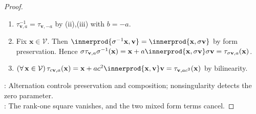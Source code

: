 \begin{proposition}
\begin{proof}
\begin{enumerate}[label=(\roman*)]
\item[$(iv)$] $\tau_{\mathbf{v},a}^{-1}=\tau_{\mathbf{v},-a}$ by (ii),(iii) with $b=-a$.
\item[$(v)$] Fix $\mathbf{x}\in\mathcal{V}$. Then $\innerprod{\sigma^{-1}\mathbf{x},\mathbf{v}}=\innerprod{\mathbf{x},\sigma\mathbf{v}}$ by form preservation. Hence $\sigma\tau_{\mathbf{v},a}\sigma^{-1}(\mathbf{x})=\mathbf{x}+a\innerprod{\mathbf{x},\sigma\mathbf{v}}\sigma\mathbf{v}=\tau_{\sigma\mathbf{v},a}(\mathbf{x})$.
\item[$(vi)$] $(\forall\,\mathbf{x}\in\mathcal{V})\,\tau_{c\mathbf{v},a}(\mathbf{x})=\mathbf{x}+ac^2\innerprod{\mathbf{x},\mathbf{v}}\mathbf{v}=\tau_{\mathbf{v},ac^2}(\mathbf{x})$ by bilinearity.
\end{enumerate}
: Alternation controls preservation and composition; nonsingularity detects the zero parameter.\\
: The rank-one square vanishes, and the two mixed form terms cancel.
\end{proof}
\end{proposition}

